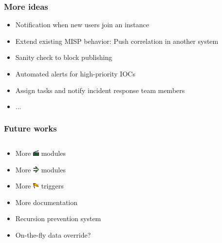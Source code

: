 \begin{frame}
    \frametitle{More ideas}
    \begin{itemize}
        \item Notification when new users join an instance
        \item Extend existing MISP behavior: Push correlation in another system
        \item Sanity check to block publishing
        \item Automated alerts for high-priority IOCs
        \item Assign tasks and notify incident response team members
        \item ...
    \end{itemize}
\end{frame}

\begin{frame}
    \frametitle{Future works}
    \begin{columns}
        \begin{column}{0.55\textwidth}
            \begin{itemize}
                \item More \includegraphics[width=12px]{pictures/sc-action-icon.png} modules
                \item More \includegraphics[width=12px]{pictures/sc-condition-icon.png} modules
                \item More \includegraphics[width=12px]{pictures/sc-event-icon.png} triggers
                \item More documentation
                \item Recursion prevention system
                \item On-the-fly data override?
            \end{itemize}
        \end{column}
        \begin{column}{0.45\textwidth}

\end{column}
\end{columns}
\end{frame}
